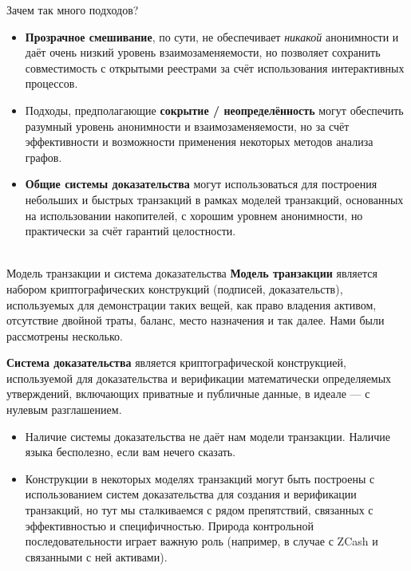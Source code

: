 \documentclass[aspectratio=169]{beamer}
\begin{document}
\begin{frame}{Зачем так много подходов?}
\begin{itemize}
\item \textbf{Прозрачное смешивание}, по сути, не обеспечивает \textit{никакой} анонимности и даёт очень низкий уровень взаимозаменяемости, но позволяет сохранить совместимость с открытыми реестрами за счёт использования интерактивных процессов.
\item Подходы, предполагающие \textbf{сокрытие / неопределённость} могут обеспечить разумный уровень анонимности и взаимозаменяемости, но за счёт эффективности и возможности применения некоторых методов анализа графов.
\item \textbf{Общие системы доказательства} могут использоваться для построения небольших и быстрых транзакций в рамках моделей транзакций, основанных на использовании накопителей, с хорошим уровнем анонимности, но практически за счёт гарантий целостности. \\~\\
\end{itemize}
\end{frame}


\begin{frame}{Модель транзакции и система доказательства}
\textbf{Модель транзакции} является набором криптографических конструкций (подписей, доказательств), используемых для демонстрации таких вещей, как право владения активом, отсутствие двойной траты, баланс, место назначения и так далее. Нами были рассмотрены несколько.

\textbf{Система доказательства} является криптографической конструкцией, используемой для доказательства и верификации математически определяемых утверждений, включающих приватные и публичные данные, в идеале — с нулевым разглашением.

\begin{itemize}
\item Наличие системы доказательства не даёт нам модели транзакции. Наличие языка бесполезно, если вам нечего сказать.
\item Конструкции в некоторых моделях транзакций могут быть построены с использованием систем доказательства для создания и верификации транзакций, но тут мы сталкиваемся с рядом препятствий, связанных с эффективностью и специфичностью. Природа контрольной последовательности играет важную роль (например, в случае с ZCash и связанными с ней активами).
\end{itemize}
\end{frame}
\end{document}
